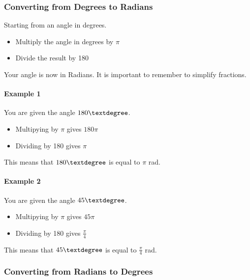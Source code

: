 \documentclass[
  12pt,
  a4paper, oneside]{starmastarticle}
\let\oldparagraph\paragraph
\renewcommand{\paragraph}[1]{\oldparagraph{#1}\mbox{}}
\providecommand{\tightlist}{%
  \setlength{\itemsep}{0pt}\setlength{\parskip}{0pt}}\usepackage{longtable,booktabs,array}
\begin{document}
\hypertarget{converting-from-degrees-to-radians}{%
\subsubsection{Converting from Degrees to
Radians}\label{converting-from-degrees-to-radians}}

Starting from an angle in degrees.

\begin{itemize}
\tightlist
\item
  Multiply the angle in degrees by \(\pi\)
\item
  Divide the result by 180
\end{itemize}

Your angle is now in Radians. It is important to remember to simplify
fractions.

\hypertarget{example-1}{%
\paragraph{Example 1}\label{example-1}}

You are given the angle \(180\textdegree\).

\begin{itemize}
\tightlist
\item
  Multipying by \(\pi\) gives \(180\pi\)
\item
  Dividing by 180 gives \(\pi\)
\end{itemize}

This means that \(180\textdegree\) is equal to \(\pi\) rad.

\hypertarget{example-2}{%
\paragraph{Example 2}\label{example-2}}

You are given the angle \(45\textdegree\).

\begin{itemize}
\tightlist
\item
  Multipying by \(\pi\) gives \(45\pi\)
\item
  Dividing by 180 gives \(\frac{\pi}{4}\)
\end{itemize}

This means that \(45\textdegree\) is equal to \(\frac{\pi}{4}\) rad.

\hypertarget{converting-from-radians-to-degrees}{%
\subsubsection{Converting from Radians to
Degrees}\label{converting-from-radians-to-degrees}}
\end{document}

